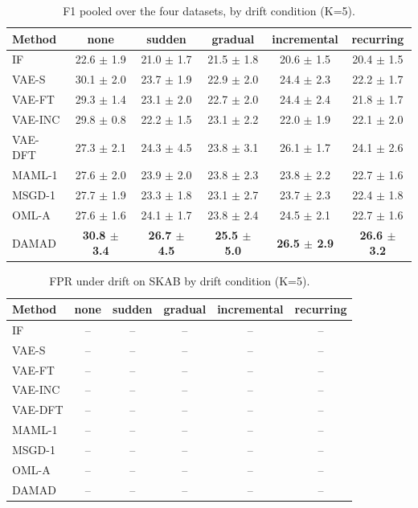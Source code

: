 \begin{table}[t]
\centering
\small
\caption{F1 pooled over the four datasets, by drift condition (K=5).}
\label{tab:drift_f1_all}
\begin{tabular}{lccccc}
\toprule
Method & none & sudden & gradual & incremental & recurring \\
\midrule
IF & 22.6 $\pm$ 1.9 & 21.0 $\pm$ 1.7 & 21.5 $\pm$ 1.8 & 20.6 $\pm$ 1.5 & 20.4 $\pm$ 1.5 \\
VAE-S & 30.1 $\pm$ 2.0 & 23.7 $\pm$ 1.9 & 22.9 $\pm$ 2.0 & 24.4 $\pm$ 2.3 & 22.2 $\pm$ 1.7 \\
VAE-FT & 29.3 $\pm$ 1.4 & 23.1 $\pm$ 2.0 & 22.7 $\pm$ 2.0 & 24.4 $\pm$ 2.4 & 21.8 $\pm$ 1.7 \\
VAE-INC & 29.8 $\pm$ 0.8 & 22.2 $\pm$ 1.5 & 23.1 $\pm$ 2.2 & 22.0 $\pm$ 1.9 & 22.1 $\pm$ 2.0 \\
VAE-DFT & 27.3 $\pm$ 2.1 & 24.3 $\pm$ 4.5 & 23.8 $\pm$ 3.1 & 26.1 $\pm$ 1.7 & 24.1 $\pm$ 2.6 \\
MAML-1 & 27.6 $\pm$ 2.0 & 23.9 $\pm$ 2.0 & 23.8 $\pm$ 2.3 & 23.8 $\pm$ 2.2 & 22.7 $\pm$ 1.6 \\
MSGD-1 & 27.7 $\pm$ 1.9 & 23.3 $\pm$ 1.8 & 23.1 $\pm$ 2.7 & 23.7 $\pm$ 2.3 & 22.4 $\pm$ 1.8 \\
OML-A & 27.6 $\pm$ 1.6 & 24.1 $\pm$ 1.7 & 23.8 $\pm$ 2.4 & 24.5 $\pm$ 2.1 & 22.7 $\pm$ 1.6 \\
DAMAD & \textbf{30.8 $\pm$ 3.4} & \textbf{26.7 $\pm$ 4.5} & \textbf{25.5 $\pm$ 5.0} & \textbf{26.5 $\pm$ 2.9} & \textbf{26.6 $\pm$ 3.2} \\
\bottomrule
\end{tabular}
\end{table}

\begin{table}[t]
\centering
\small
\caption{FPR under drift on SKAB by drift condition (K=5).}
\label{tab:drift_fpr_drift_skab}
\begin{tabular}{lccccc}
\toprule
Method & none & sudden & gradual & incremental & recurring \\
\midrule
IF & – & – & – & – & – \\
VAE-S & – & – & – & – & – \\
VAE-FT & – & – & – & – & – \\
VAE-INC & – & – & – & – & – \\
VAE-DFT & – & – & – & – & – \\
MAML-1 & – & – & – & – & – \\
MSGD-1 & – & – & – & – & – \\
OML-A & – & – & – & – & – \\
DAMAD & – & – & – & – & – \\
\bottomrule
\end{tabular}
\end{table}

